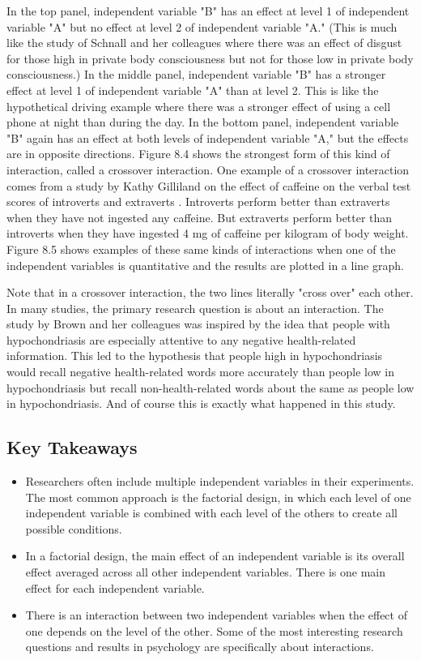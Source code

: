 In the top panel, independent variable "B" has an effect at level 1 of independent variable "A" but no effect at level 2 of independent variable "A." (This is much like the study of Schnall and her colleagues where there was an effect of disgust for those high in private body consciousness but not for those low in private body consciousness.) In the middle panel, independent variable "B" has a stronger effect at level 1 of independent variable "A" than at level 2. This is like the hypothetical driving example where there was a stronger effect of using a cell phone at night than during the day. In the bottom panel, independent variable "B" again has an effect at both levels of independent variable "A," but the effects are in opposite directions. Figure 8.4 shows the strongest form of this kind of interaction, called a crossover interaction. One example of a crossover interaction comes from a study by Kathy Gilliland on the effect of caffeine on the verbal test scores of introverts and extraverts \citep{gilliland_interactive_1980}. Introverts perform better than extraverts when they have not ingested any caffeine. But extraverts perform better than introverts when they have ingested 4 mg of caffeine per kilogram of body weight. Figure 8.5 shows examples of these same kinds of interactions when one of the independent variables is quantitative and the results are plotted in a line graph.


Note that in a crossover interaction, the two lines literally "cross over" each other. In many studies, the primary research question is about an interaction. The study by Brown and her colleagues was inspired by the idea that people with hypochondriasis are especially attentive to any negative health-related information. This led to the hypothesis that people high in hypochondriasis would recall negative health-related words more accurately than people low in hypochondriasis but recall non-health-related words about the same as people low in hypochondriasis. And of course this is exactly what happened in this study.

\subsection{Key Takeaways}

\begin{itemize}

\item Researchers often include multiple independent variables in their experiments. The most common approach is the factorial design, in which each level of one independent variable is combined with each level of the others to create all possible conditions.
\item In a factorial design, the main effect of an independent variable is its overall effect averaged across all other independent variables. There is one main effect for each independent variable.
\item There is an interaction between two independent variables when the effect of one depends on the level of the other. Some of the most interesting research questions and results in psychology are specifically about interactions.


\end{itemize}

